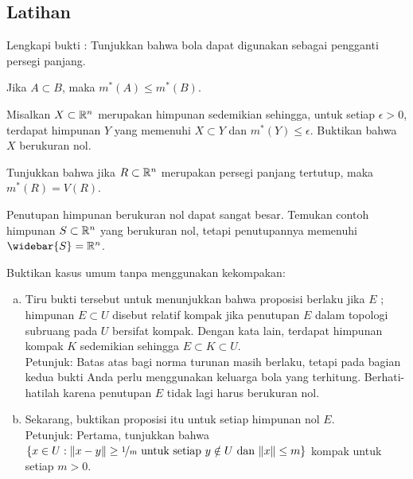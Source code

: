 \subsection{Latihan}

\begin{exercise}
Lengkapi bukti : Tunjukkan bahwa bola dapat
digunakan sebagai pengganti persegi panjang.
\end{exercise}

\begin{exercise} \label{exercise:outermeasuremono}
Jika $A\subset B$, maka $m^*(A)\leq m^*(B)$.
\end{exercise}

\begin{exercise}
Misalkan $X\subset{\mathbb{R}}^n$ merupakan himpunan sedemikian sehingga, untuk setiap
$\epsilon>0$, terdapat himpunan $Y$ yang memenuhi $X\subset Y$ dan
$m^*(Y)\leq\epsilon$. Buktikan bahwa $X$ berukuran nol.
\end{exercise}

\begin{exercise} \label{exercise:rectanglemeasure}
Tunjukkan bahwa jika $R\subset{\mathbb{R}}^n$ merupakan persegi panjang tertutup, maka
$m^*(R)=V(R)$.
\end{exercise}

\begin{exercise}
Penutupan himpunan berukuran nol dapat sangat besar. Temukan contoh himpunan
$S\subset{\mathbb{R}}^n$ yang berukuran nol, tetapi penutupannya memenuhi
$\widebar{S}=\R^n$.
\end{exercise}

\begin{exercise}
\pagebreak[2]
Buktikan kasus umum  tanpa menggunakan kekompakan:
\begin{enumerate}[a)]
\item
Tiru bukti tersebut untuk menunjukkan bahwa proposisi berlaku jika $E$
\emph{}; himpunan $E\subset U$ disebut relatif kompak
jika penutupan $E$ dalam topologi subruang pada $U$ bersifat kompak. Dengan kata
lain, terdapat himpunan kompak $K$ sedemikian sehingga $E\subset K\subset U$.\\
Petunjuk: Batas atas bagi norma turunan masih berlaku, tetapi pada bagian kedua
bukti Anda perlu menggunakan keluarga bola yang terhitung. Berhati-hatilah
karena penutupan $E$ tidak lagi harus berukuran nol.
\item
Sekarang, buktikan proposisi itu untuk setiap himpunan nol $E$.\\
Petunjuk: Pertama, tunjukkan bahwa
$\{x\in U : \lVert {x-y} \rVert\geq
\nicefrac{1}{m} \text{ untuk setiap } y\notin U
\text{ dan } \lVert {x} \rVert\leq m\}$ kompak untuk setiap $m>0$.
\end{enumerate}
\end{exercise}

